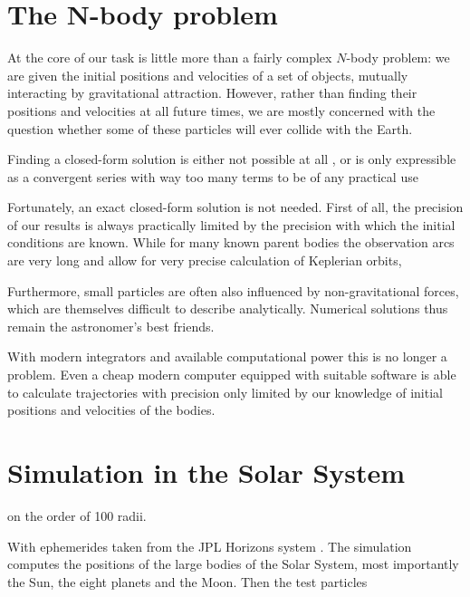 


\section{The N-body problem} \label{mN}
    At the core of our task is little more than a fairly complex $N$-body problem: we are given
    the initial positions and velocities of a set of objects, mutually interacting by gravitational attraction.
    However, rather than finding their positions and velocities at all future times, we are mostly concerned
    with the question whether some of these particles will ever collide with the Earth.

    Finding a closed-form solution is either not possible at all \cite{...}, or is only expressible
    as a convergent series with way too many terms to be of any practical use \cite{beloriszky-1930}

    Fortunately, an exact closed-form solution is not needed. First of all, the precision of our results
    is always practically limited by the precision with which the initial conditions are known.
    While for many known parent bodies the observation arcs are very long and allow for very precise
    calculation of Keplerian orbits,

    Furthermore, small particles are often also influenced by non-gravitational forces,
    which are themselves difficult to describe analytically.
    Numerical solutions thus remain the astronomer's best friends.

    With modern integrators and available computational power this is no longer a problem.
    Even a cheap modern computer equipped with suitable software is able to calculate trajectories
    with precision only limited by our knowledge of initial positions and velocities of the bodies.

\section{Simulation in the Solar System} \label{as}
    on the order of 100 radii.

    With ephemerides taken from the JPL Horizons system \citep{...}.
    The simulation computes the positions of the large bodies of the Solar System, most importantly the Sun,
    the eight planets and the Moon. Then the test particles

